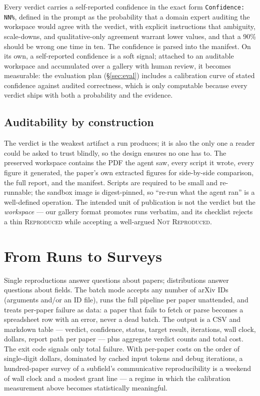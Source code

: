 \documentclass[10pt]{article}
\newcommand{\verdict}[1]{\textsc{#1}}
\begin{document}
Every verdict carries a self-reported confidence in the exact form \texttt{Confidence: NN\%}, defined in the prompt as the probability that a domain expert auditing the workspace would agree with the verdict, with explicit instructions that ambiguity, scale-downs, and qualitative-only agreement warrant lower values, and that a 90\% should be wrong one time in ten. The confidence is parsed into the manifest. On its own, a self-reported confidence is a soft signal; attached to an auditable workspace and accumulated over a gallery with human review, it becomes measurable: the evaluation plan (\S\ref{sec:eval}) includes a calibration curve of stated confidence against audited correctness, which is only computable because every verdict ships with both a probability and the evidence.

\subsection{Auditability by construction}

The verdict is the weakest artifact a run produces; it is also the only one a reader could be asked to trust blindly, so the design ensures no one has to. The preserved workspace contains the PDF the agent saw, every script it wrote, every figure it generated, the paper's own extracted figures for side-by-side comparison, the full report, and the manifest. Scripts are required to be small and re-runnable; the sandbox image is digest-pinned, so ``re-run what the agent ran'' is a well-defined operation. The intended unit of publication is not the verdict but the \emph{workspace} --- our gallery format promotes runs verbatim, and its checklist rejects a thin \verdict{Reproduced} while accepting a well-argued \verdict{Not Reproduced}.

\section{From Runs to Surveys}\label{sec:batch}

Single reproductions answer questions about papers; distributions answer questions about fields. The batch mode accepts any number of arXiv IDs (arguments and/or an ID file), runs the full pipeline per paper unattended, and treats per-paper failure as data: a paper that fails to fetch or parse becomes a spreadsheet row with an error, never a dead batch. The output is a CSV and markdown table --- verdict, confidence, status, target result, iterations, wall clock, dollars, report path per paper --- plus aggregate verdict counts and total cost. The exit code signals only total failure. With per-paper costs on the order of single-digit dollars, dominated by cached input tokens and debug iterations, a hundred-paper survey of a subfield's communicative reproducibility is a weekend of wall clock and a modest grant line --- a regime in which the calibration measurement above becomes statistically meaningful.
\end{document}
